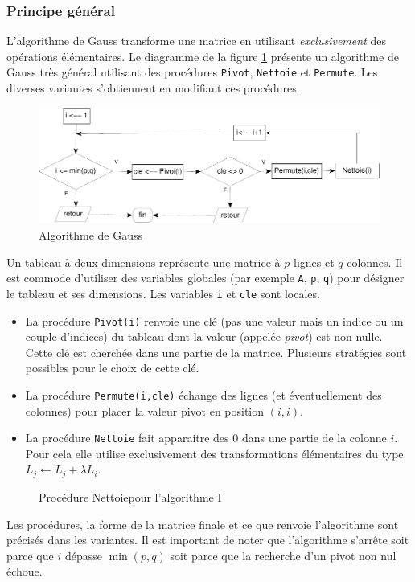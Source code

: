 \subsubsection{Principe général}
L'algorithme de Gauss transforme une matrice en utilisant \emph{exclusivement} des opérations élémentaires.\newline
Le diagramme de la figure \ref{fig:C2234_1} présente un algorithme de Gauss très général utilisant des procédures \verb|Pivot|, \verb|Nettoie| et \verb|Permute|. Les diverses variantes s'obtiennent en modifiant ces procédures.
\begin{figure}[h!t]
 \centering
 \includegraphics{C2234_1.pdf}
 \caption{Algorithme de Gauss}
 \label{fig:C2234_1}
\end{figure}
Un tableau à deux dimensions représente une matrice à $p$ lignes et $q$ colonnes. Il est commode d'utiliser des variables globales (par exemple \verb|A|, \verb|p|, \verb|q|) pour désigner le tableau et ses dimensions. Les variables \verb|i| et \verb|cle| sont locales. \medskip
\begin{itemize}
  \item La procédure \verb|Pivot(i)| renvoie une clé (pas une valeur mais un indice ou un couple d'indices) du tableau dont la valeur (appelée \emph{pivot}) est non nulle. Cette clé est cherchée dans une partie de la matrice. Plusieurs stratégies sont possibles pour le choix de cette clé.\medskip
  \item La procédure \verb|Permute(i,cle)| échange des lignes (et éventuellement des colonnes) pour placer la valeur pivot en position $(i,i)$.\medskip
  \item La procédure \verb|Nettoie| fait apparaitre des $0$ dans une partie de la colonne $i$. Pour cela elle utilise exclusivement des transformations élémentaires du type
$L_j \longleftarrow L_j + \lambda L_i$. \medskip
\end{itemize}
\begin{figure}[ht]
 \centering
 
 \caption{Procédure \og Nettoie\fg pour l'algorithme I}
 \label{fig:C2234_2}
\end{figure}
Les procédures, la forme de la matrice finale et ce que renvoie l'algorithme sont précisés dans les variantes.\newline
Il est important de noter que l'algorithme s'arrête soit parce que $i$ dépasse $\min(p,q)$ soit parce que la recherche d'un pivot non nul échoue.


